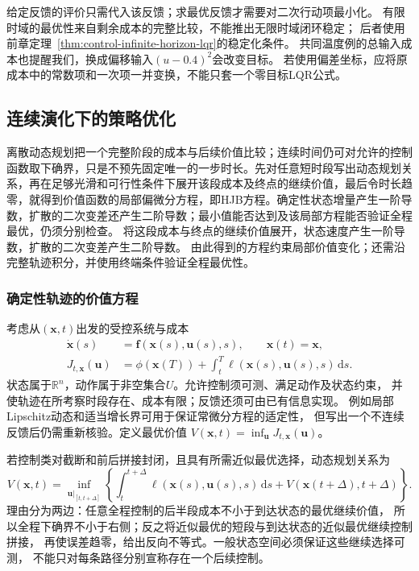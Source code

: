 给定反馈的评价只需代入该反馈；求最优反馈才需要对二次行动项最小化。
有限时域的最优性来自剩余成本的完整比较，不能推出无限时域闭环稳定；
后者使用前章定理~\ref{thm:control-infinite-horizon-lqr}的稳定化条件。
共同温度例的总输入成本也提醒我们，换成偏移输入$(u-0.4)^2$会改变目标。
若使用偏差坐标，应将原成本中的常数项和一次项一并变换，不能只套一个零目标LQR公式。

\subsection{连续演化下的策略优化}
\label{sec:control-hjb}

离散动态规划把一个完整阶段的成本与后续价值比较；连续时间仍可对允许的控制函数取下确界，只是不预先固定唯一的一步时长。先对任意短时段写出动态规划关系，再在足够光滑和可行性条件下展开该段成本及终点的继续价值，最后令时长趋零，就得到价值函数的局部偏微分方程，即HJB方程。确定性状态增量产生一阶导数，扩散的二次变差还产生二阶导数；最小值能否达到及该局部方程能否验证全程最优，仍须分别检查。
将这段成本与终点的继续价值展开，状态速度产生一阶导数，扩散的二次变差产生二阶导数。
由此得到的方程约束局部价值变化；还需沿完整轨迹积分，并使用终端条件验证全程最优性。

\subsubsection{确定性轨迹的价值方程}

考虑从$(\bm x,t)$出发的受控系统与成本
\begin{align}
  \dot{\bm x}(s)&=\bm f(\bm x(s),\bm u(s),s),\qquad \bm x(t)=\bm x,
  \label{eq:control-continuous-dynamics}\\
  J_{t,\bm x}(\bm u)
  &=\phi(\bm x(T))+\int_t^T\ell(\bm x(s),\bm u(s),s)\,\mathrm ds.
  \label{eq:control-continuous-cost}
\end{align}
状态属于$\mathbb R^n$，动作属于非空集合$U$。允许控制须可测、满足动作及状态约束，
并使轨迹在所考察时段存在、成本有限；反馈还须可由已有信息实现。
例如局部Lipschitz动态和适当增长界可用于保证常微分方程的适定性，
但写出一个不连续反馈后仍需重新核验。定义最优价值
$V(\bm x,t)=\inf_{\bm u}J_{t,\bm x}(\bm u)$。

若控制类对截断和前后拼接封闭，且具有所需近似最优选择，动态规划关系为
\begin{equation}
  V(\bm x,t)=\inf_{\bm u|_{[t,t+\Delta]}}
  \left\{\int_t^{t+\Delta}\ell(\bm x(s),\bm u(s),s)\,\mathrm ds
    +V(\bm x(t+\Delta),t+\Delta)\right\}.
  \label{eq:control-continuous-dpp}
\end{equation}
理由分为两边：任意全程控制的后半段成本不小于到达状态的最优继续价值，
所以全程下确界不小于右侧；反之将近似最优的短段与到达状态的近似最优继续控制拼接，
再使误差趋零，给出反向不等式。一般状态空间必须保证这些继续选择可测，
不能只对每条路径分别宣称存在一个后续控制。

